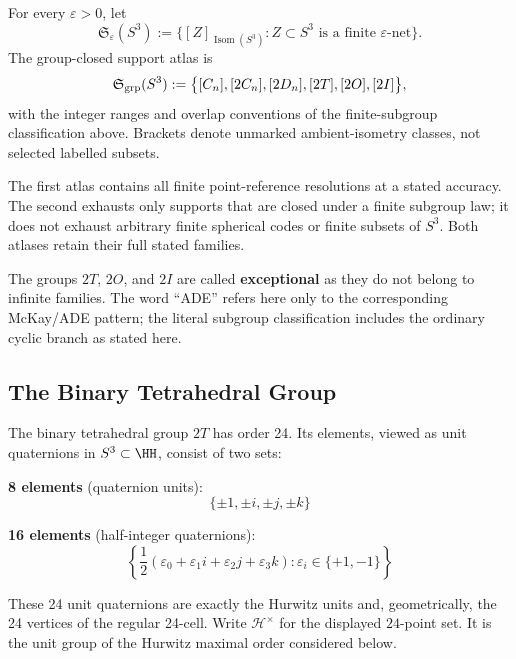 \documentclass[11pt]{article}
\begin{document}
\begin{definition}
\label{p1:def:finite-support-atlases}
For every \(\varepsilon>0\), let
\[
 \mathfrak S_\varepsilon(S^3)
 :=
 \bigl\{[Z]_{\operatorname{Isom}(S^3)}:
 Z\subset S^3\text{ is a finite }\varepsilon\text{-net}\bigr\}.
\]
The group-closed support atlas is
\[
 \mathfrak S_{\rm grp}(S^3)
 :=
 \bigl\{[C_n],[2C_n],[2D_n],[2T],[2O],[2I]\bigr\},
\]
with the integer ranges and overlap conventions of the finite-subgroup
classification above.  Brackets denote unmarked ambient-isometry classes,
not selected labelled subsets.

The first atlas contains all finite point-reference resolutions at a stated
accuracy.  The second exhausts only supports that are closed under a finite
subgroup law; it does not exhaust arbitrary finite spherical codes or finite
subsets of \(S^3\). Both atlases retain their full stated families.
\end{definition}


The groups $2T$, $2O$, and $2I$ are called \textbf{exceptional} as they do not 
belong to infinite families.  The word ``ADE'' refers here only to the corresponding McKay/ADE pattern; the literal subgroup classification includes the ordinary cyclic branch as stated here.

\subsection{The Binary Tetrahedral Group}

The binary tetrahedral group $2T$ has order 24. Its elements, viewed as unit
quaternions in $S^3 \subset \HH$, consist of two sets:

\textbf{8 elements} (quaternion units):
\begin{equation}
    \{\pm 1, \pm i, \pm j, \pm k\}
\end{equation}

\textbf{16 elements} (half-integer quaternions):
\begin{equation}
    \left\{\frac{1}{2}(\varepsilon_0 + \varepsilon_1 i + \varepsilon_2 j + \varepsilon_3 k)
    : \varepsilon_i \in \{+1, -1\}\right\}
\end{equation}

These 24 unit quaternions are exactly the Hurwitz units and, geometrically,
the 24 vertices of the regular 24-cell.
\cite{conwaysmith2003quaternions,coxeter1973regular}
Write \(\mathcal H^{\times}\) for the displayed \(24\)-point set.
It is the unit group of the Hurwitz maximal order considered below.
\end{document}
